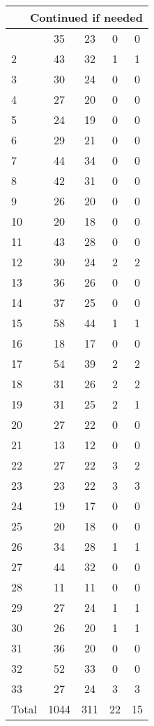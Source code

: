 \begin{center}
\begin{longtable}{l|c|c|c|c}
\hline \multicolumn{5}{|r|}{{Continued if needed}} \\ \hline
\endfoot 
1 & 35 & 23 & 0 & 0\\ \hline
2 & 43 & 32 & 1 & 1\\ \hline
3 & 30 & 24 & 0 & 0\\ \hline
4 & 27 & 20 & 0 & 0\\ \hline
5 & 24 & 19 & 0 & 0\\ \hline
6 & 29 & 21 & 0 & 0\\ \hline
7 & 44 & 34 & 0 & 0\\ \hline
8 & 42 & 31 & 0 & 0\\ \hline
9 & 26 & 20 & 0 & 0\\ \hline
10 & 20 & 18 & 0 & 0\\ \hline
11 & 43 & 28 & 0 & 0\\ \hline
12 & 30 & 24 & 2 & 2\\ \hline
13 & 36 & 26 & 0 & 0\\ \hline
14 & 37 & 25 & 0 & 0\\ \hline
15 & 58 & 44 & 1 & 1\\ \hline
16 & 18 & 17 & 0 & 0\\ \hline
17 & 54 & 39 & 2 & 2\\ \hline
18 & 31 & 26 & 2 & 2\\ \hline
19 & 31 & 25 & 2 & 1\\ \hline
20 & 27 & 22 & 0 & 0\\ \hline
21 & 13 & 12 & 0 & 0\\ \hline
22 & 27 & 22 & 3 & 2\\ \hline
23 & 23 & 22 & 3 & 3\\ \hline
24 & 19 & 17 & 0 & 0\\ \hline
25 & 20 & 18 & 0 & 0\\ \hline
26 & 34 & 28 & 1 & 1\\ \hline
27 & 44 & 32 & 0 & 0\\ \hline
28 & 11 & 11 & 0 & 0\\ \hline
29 & 27 & 24 & 1 & 1\\ \hline
30 & 26 & 20 & 1 & 1\\ \hline
31 & 36 & 20 & 0 & 0\\ \hline
32 & 52 & 33 & 0 & 0\\ \hline
33 & 27 & 24 & 3 & 3\\ \hline
Total & 1044 & 311 & 22 & 15
\end{longtable}
\end{center}



